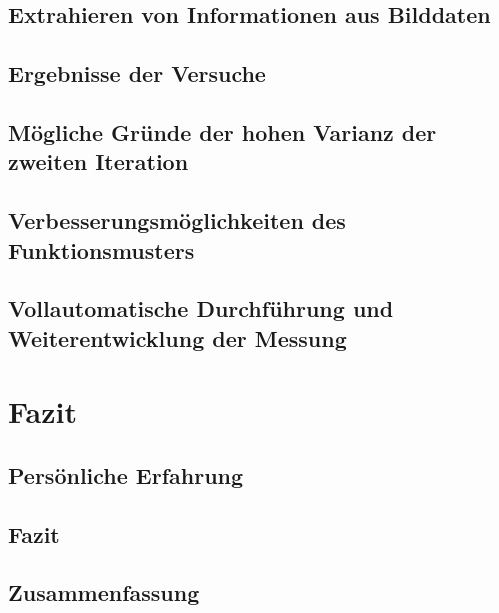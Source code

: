 \documentclass[a4paper,12pt]{article}
\begin{document}
\subsection{Extrahieren von Informationen aus Bilddaten}
\label{sec:DB}



\newpage
\subsection{Ergebnisse der Versuche}

\newpage
\subsection{Mögliche Gründe der hohen Varianz der zweiten Iteration}

%

\subsection{Verbesserungsmöglichkeiten des Funktionsmusters}

\newpage
\subsection{Vollautomatische Durchführung und Weiterentwicklung der Messung}


\newpage
\section{Fazit}
%

\subsection{Persönliche Erfahrung}


\subsection{Fazit}


\subsection{Zusammenfassung}

\end{document}
